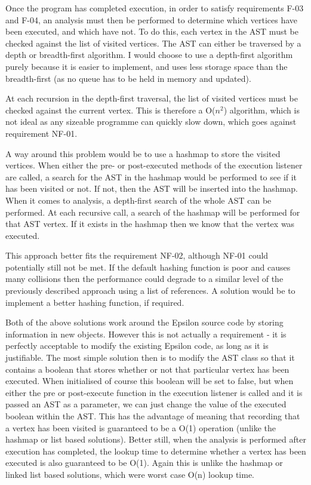 Once the program has completed execution, in order to satisfy requirements F-03 and F-04, an analysis must then be performed to determine which vertices have been executed, and which have not. To do this, each vertex in the AST must be checked against the list of visited vertices. The AST can either be traversed by a depth or breadth-first algorithm. I would choose to use a depth-first algorithm purely because it is easier to implement, and uses less storage space than the breadth-first (as no queue has to be held in memory and updated).

At each recursion in the depth-first traversal, the list of visited vertices must be checked against the current vertex. This is therefore a O($n^2$) algorithm, which is not ideal as any sizeable programme can quickly slow down, which goes against requirement NF-01. 

A way around this problem would be to use a hashmap to store the visited vertices. When either the pre- or post-executed methods of the execution listener are called, a search for the AST in the hashmap would be performed to see if it has been visited or not. If not, then the AST will be inserted into the hashmap. When it comes to analysis, a depth-first search of the whole AST can be performed. At each recursive call, a search of the hashmap will be performed for that AST vertex. If it exists in the hashmap then we know that the vertex was executed.

This approach better fits the requirement NF-02, although NF-01 could potentially still not be met. If the default hashing function is poor and causes many collisions then the performance could degrade to a similar level of the previously described approach using a list of references. A solution would be to implement a better hashing function, if required.	

Both of the above solutions work around the Epsilon source code by storing information in new objects. However this is not actually a requirement - it is perfectly acceptable to modify the existing Epsilon code, as long as it is justifiable. The most simple solution then is to modify the AST class so that it contains a boolean that stores whether or not that particular vertex has been executed. When initialised of course this boolean will be set to false, but when either the pre or post-execute function in the execution listener is called and it is passed an AST as a parameter, we can just change the value of the executed boolean within the AST. This has the advantage of meaning that recording that a vertex has been visited is guaranteed to be a O(1) operation (unlike the hashmap or list based solutions). Better still, when the analysis is performed after execution has completed, the lookup time to determine whether a vertex has been executed is also guaranteed to be O(1). Again this is unlike the hashmap or linked list based solutions, which were worst case O(n) lookup time.

